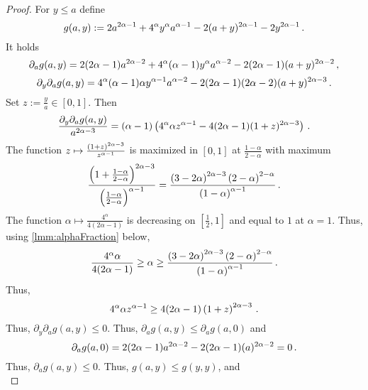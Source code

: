 \begin{proof}
	For $y\leq a$ define
	\begin{equation*}
		g(a,y) := 2a^{2\alpha-1} + 4^\alpha y^\alpha a^{\alpha-1} - 2(a+y)^{2\alpha-1} - 2y^{2\alpha-1}
		\, .
	\end{equation*}
	It holds
	\begin{equation*}
		\partial_a g(a,y) = 2(2\alpha-1)a^{2\alpha-2} + 4^\alpha(\alpha-1) y^\alpha a^{\alpha-2} - 2(2\alpha-1)(a+y)^{2\alpha-2}
		\, ,
	\end{equation*}
	\begin{equation*}
		\partial_y \partial_a g(a,y) = 4^\alpha (\alpha-1) \alpha y^{\alpha-1} a^{\alpha-2} - 2(2\alpha-1)(2\alpha-2)(a+y)^{2\alpha-3}
		\, .
	\end{equation*}
	Set $z := \frac{y}{a} \in[0,1]$. Then
	\begin{equation*}
	 \frac{\partial_y \partial_a g(a,y)}{a^{2\alpha-3}} =  (\alpha-1) \left( 4^\alpha \alpha z^{\alpha-1} - 4(2\alpha-1)(1+z)^{2\alpha-3} \right)
	 \, .
	\end{equation*}
	The function $z \mapsto \frac{\left( 1+z \right)^{2\alpha-3}}{z^{\alpha-1}}$ is maximized in $[0,1]$ at $\frac{1-\alpha}{2-\alpha}$ with maximum 
	\begin{equation*}
		\frac{\left( 1+\frac{1-\alpha}{2-\alpha} \right)^{2\alpha-3}}{\left( \frac{1-\alpha}{2-\alpha} \right)^{\alpha-1}}
		=
		\frac{\left( 3-2\alpha \right)^{2\alpha-3} \left( 2-\alpha \right)^{2-\alpha}}{\left( 1-\alpha \right)^{\alpha-1}} 
		\, .
	\end{equation*}
	The function $\alpha\mapsto \frac{4^\alpha}{4(2\alpha-1)}$ is decreasing on $[\frac12, 1]$ and equal to $1$ at $\alpha=1$. 
	Thus, using \autoref{lmm:alphaFraction} below, 
	\begin{equation*}
		\frac{4^\alpha \alpha}{4(2\alpha-1)} \geq \alpha \geq \frac{\left( 3-2\alpha \right)^{2\alpha-3} \left( 2-\alpha \right)^{2-\alpha}}{\left( 1-\alpha \right)^{\alpha-1}} 
		\, .
	\end{equation*}
	Thus,
	\begin{equation*}
		4^\alpha \alpha z^{\alpha-1} \geq 4(2\alpha-1) \left( 1+z \right)^{2\alpha-3}
		\, .
	\end{equation*}
	Thus, $\partial_y \partial_a g(a,y) \leq 0$. Thus, $\partial_a g(a,y) \leq \partial_a g(a,0)$ and
	\begin{equation*}
		\partial_a  g(a,0) = 2(2\alpha-1)a^{2\alpha-2} - 2(2\alpha-1)(a)^{2\alpha-2} = 0
		\, .
	\end{equation*}
	Thus, $\partial_a g(a,y) \leq 0$. Thus, $g(a,y) \leq g(y,y)$, and
	\begin{equation*}

\end{equation*}
\end{proof}
